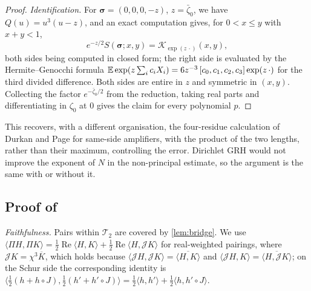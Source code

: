 \documentclass[11pt,colorlinks]{charlie}
\newcommand{\ip}[2]{\langle #1,#2\rangle}
\begin{document}
\begin{proof}
\emph{Identification.} For $\boldsymbol\sigma=(0,0,0,-z)$, $z=\bar\zeta_0$, we have $Q(u)=u^3(u-z)$, and an exact computation gives, for $0<x\le y$ with $x+y<1$,
\[
 e^{-z/2}S(\boldsymbol\sigma;x,y)=\mathcal K_{\exp(z\,\cdot)}(x,y),
\]
both sides being computed in closed form; the right side is evaluated by the Hermite--Genocchi formula $\mathbb{E}\exp(z\sum_ic_iX_i)=6z^{-3}\,[c_0,c_1,c_2,c_3]\exp(z\,\cdot)$ for the third divided difference. Both sides are entire in $z$ and symmetric in $(x,y)$. Collecting the factor $e^{-\bar\zeta_0/2}$ from the reduction, taking real parts and differentiating in $\zeta_0$ at $0$ gives the claim for every polynomial $p$.
\end{proof}

\begin{remark}
This recovers, with a different organisation, the four-residue calculation of Durkan and Page \cite[\S5.2]{DP} for same-side amplifiers, with the product of the two lengths, rather than their maximum, controlling the error. Dirichlet GRH would not improve the exponent of $N$ in the non-principal estimate, so the argument is the same with or without it.
\end{remark}

\subsection{Proof of }
\emph{Faithfulness.} Pairs within $\mathcal T_2$ are covered by \cref{lem:bridge}. We use $\ip{\Pi H}{\Pi K}=\frac12\operatorname{Re}\ip HK+\frac12\operatorname{Re}\ip H{\mathcal JK}$ for real-weighted pairings, where $\mathcal JK=\chi^3\overline K$, which holds because $\ip{\mathcal JH}{\mathcal JK}=\overline{\ip HK}$ and $\ip{\mathcal JH}{K}=\overline{\ip H{\mathcal JK}}$; on the Schur side the corresponding identity is $\ip{\frac12(h+h\circ J)}{\frac12(h'+h'\circ J)}=\frac12\ip h{h'}+\frac12\ip h{h'\circ J}$.
\end{document}
